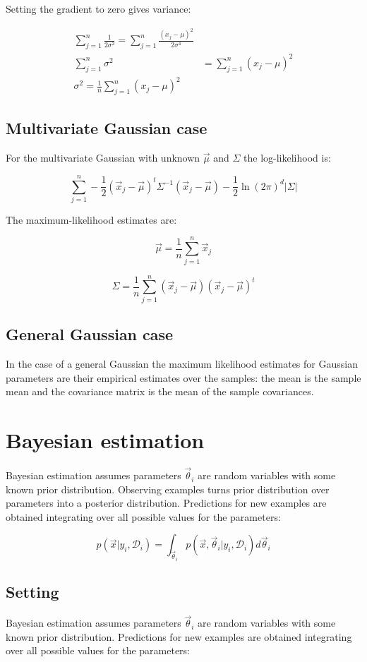 		Setting the gradient to zero gives variance:

		\begin{align*}
			\sum\limits_{j=1}^n\frac{1}{2\sigma^2} = \sum\limits_{j=1}^n\frac{(x_j-\mu)^2}{2\sigma^4}\\
			\sum\limits_{j=1}^n\sigma^2 &= \sum\limits_{j=1}^n(x_j-\mu)^2\\
			\sigma^2 = \frac{1}{n}\sum\limits_{j=1}^n(x_j-\mu)^2
		\end{align*}

	\subsection{Multivariate Gaussian case}
	For the multivariate Gaussian with unknown $\vec{\mu}$ and $\Sigma$ the log-likelihood is:

	$$\sum\limits_{j=1}^n-\frac{1}{2}(\vec{x}_j -\vec{\mu})^t\Sigma^{-1}(\vec{x}_j - \vec{\mu}) - \frac{1}{2}\ln(2\pi)^d|\Sigma|$$

	The maximum-likelihood estimates are:

	$$\vec{\mu} = \frac{1}{n}\sum\limits_{j=1}^n\vec{x}_j$$

	$$\Sigma = \frac{1}{n}\sum\limits_{j=1}^n(\vec{x}_j-\vec{\mu})(\vec{x}_j-\vec{\mu})^t$$

	\subsection{General Gaussian case}
	In the case of a general Gaussian the maximum likelihood estimates for Gaussian parameters are their empirical estimates over the samples: the mean is the sample mean and the covariance matrix is the mean of the sample covariances.


\section{Bayesian estimation}
Bayesian estimation assumes parameters $\vec{\theta}_i$ are random variables with some known prior distribution.
Observing examples turns prior distribution over parameters into a posterior distribution.
Predictions for new examples are obtained integrating over all possible values for the parameters:

$$p(\vec{x}|y_i, \mathcal{D}_i) = \int_{\vec{\theta}_i}p(\vec{x}, \vec{\theta}_i|y_i, \mathcal{D}_i)d\vec{\theta}_i$$

	\subsection{Setting}
	Bayesian estimation assumes parameters $\vec{\theta}_i$ are random variables with some known prior distribution.
	Predictions for new examples are obtained integrating over all possible values for the parameters:

